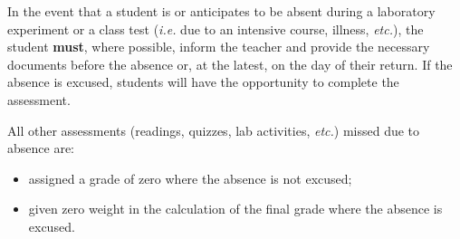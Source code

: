\entry{\mbox{ }}
{In the event that a student is or anticipates to be absent during a laboratory experiment or a class test (\textit{i.e.} due to an intensive course, illness, \textit{etc.}), the student \textbf{must}, where possible, inform the teacher and provide the necessary documents before the absence or, at the latest, on the day of their return.  If the absence is excused, students will have the opportunity to complete the assessment.
\smallskip

All other assessments (readings, quizzes, lab activities, \textit{etc.}) missed due to absence are:
\begin{itemize}
	\item assigned a grade of zero where the absence is not excused;
	\item given zero weight in the calculation of the final grade where the absence is excused.
\end{itemize}
}